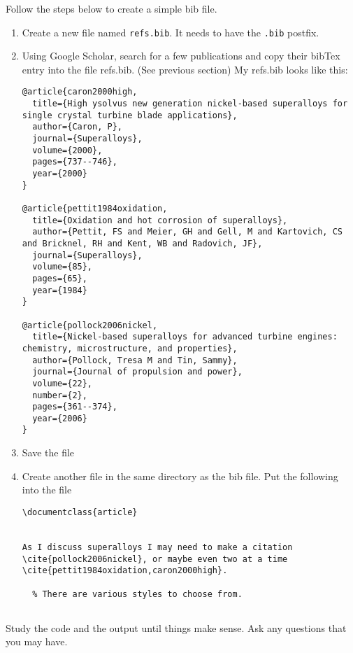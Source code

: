 \begin{enumerate}
\probtwo Follow the steps below to create a simple bib file.
\begin{enumerate}
\item Create a new file named \texttt{refs.bib}.  It needs to
have the \texttt{.bib} postfix.  
\item Using Google Scholar, search for a few publications and copy
  their bibTex entry into the file refs.bib. (See previous section)  My refs.bib looks like
  this:
\begin{Verbatim}
@article{caron2000high,
  title={High ysolvus new generation nickel-based superalloys for single crystal turbine blade applications},
  author={Caron, P},
  journal={Superalloys},
  volume={2000},
  pages={737--746},
  year={2000}
}

@article{pettit1984oxidation,
  title={Oxidation and hot corrosion of superalloys},
  author={Pettit, FS and Meier, GH and Gell, M and Kartovich, CS and Bricknel, RH and Kent, WB and Radovich, JF},
  journal={Superalloys},
  volume={85},
  pages={65},
  year={1984}
}

@article{pollock2006nickel,
  title={Nickel-based superalloys for advanced turbine engines: chemistry, microstructure, and properties},
  author={Pollock, Tresa M and Tin, Sammy},
  journal={Journal of propulsion and power},
  volume={22},
  number={2},
  pages={361--374},
  year={2006}
}

\end{Verbatim}
\item Save the file
\item Create another file in the same directory as the bib file.  Put
  the following into the file
\begin{Verbatim}
\documentclass{article}


As I discuss superalloys I may need to make a citation
\cite{pollock2006nickel}, or maybe even two at a time \cite{pettit1984oxidation,caron2000high}.

  % There are various styles to choose from.


\end{Verbatim}
\end{enumerate}
Study the code and the output until things make sense.  Ask any
questions that you may have.
\end{enumerate}

